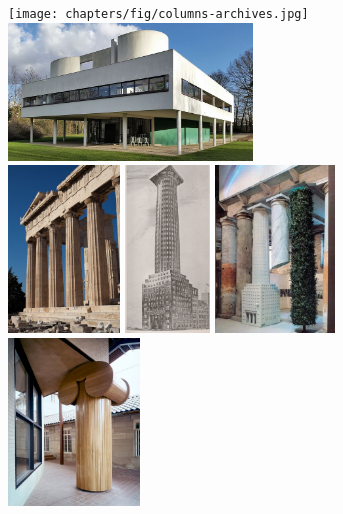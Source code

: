 \begin{figure}
\texttt{[image: chapters/fig/columns-archives.jpg]}\quad
\includegraphics[height=9.85em]{chapters/fig/columns-savoye.jpg}\quad\\[1em]
\includegraphics[height=12em]{chapters/fig/columns-greek.jpg}\quad
\includegraphics[height=12em]{chapters/fig/columns-loos.png}\quad
\includegraphics[height=12em]{chapters/fig/columns-venice.png}\quad
\includegraphics[height=12em]{chapters/fig/columns-venturi.jpg}

\end{figure}
